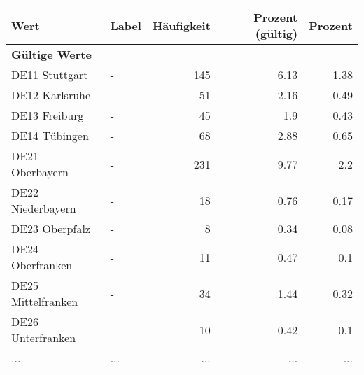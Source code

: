      \begin{longtable}{Xlrrr}
     \toprule
     \textbf{Wert} & \textbf{Label} & \textbf{Häufigkeit} & \textbf{Prozent (gültig)} & \textbf{Prozent} \\
     \endhead
     \midrule
     \multicolumn{5}{l}{\textbf{Gültige Werte}}\\
        \multicolumn{1}{X}{DE11 Stuttgart} & - & \num{145} & \num[round-mode=places,round-precision=2]{6.13} & \num[round-mode=places,round-precision=2]{1.38} \\
        \multicolumn{1}{X}{DE12 Karlsruhe} & - & \num{51} & \num[round-mode=places,round-precision=2]{2.16} & \num[round-mode=places,round-precision=2]{0.49} \\
        \multicolumn{1}{X}{DE13 Freiburg} & - & \num{45} & \num[round-mode=places,round-precision=2]{1.9} & \num[round-mode=places,round-precision=2]{0.43} \\
        \multicolumn{1}{X}{DE14 Tübingen} & - & \num{68} & \num[round-mode=places,round-precision=2]{2.88} & \num[round-mode=places,round-precision=2]{0.65} \\
        \multicolumn{1}{X}{DE21 Oberbayern} & - & \num{231} & \num[round-mode=places,round-precision=2]{9.77} & \num[round-mode=places,round-precision=2]{2.2} \\
        \multicolumn{1}{X}{DE22 Niederbayern} & - & \num{18} & \num[round-mode=places,round-precision=2]{0.76} & \num[round-mode=places,round-precision=2]{0.17} \\
        \multicolumn{1}{X}{DE23 Oberpfalz} & - & \num{8} & \num[round-mode=places,round-precision=2]{0.34} & \num[round-mode=places,round-precision=2]{0.08} \\
        \multicolumn{1}{X}{DE24 Oberfranken} & - & \num{11} & \num[round-mode=places,round-precision=2]{0.47} & \num[round-mode=places,round-precision=2]{0.1} \\
        \multicolumn{1}{X}{DE25 Mittelfranken} & - & \num{34} & \num[round-mode=places,round-precision=2]{1.44} & \num[round-mode=places,round-precision=2]{0.32} \\
        \multicolumn{1}{X}{DE26 Unterfranken} & - & \num{10} & \num[round-mode=places,round-precision=2]{0.42} & \num[round-mode=places,round-precision=2]{0.1} \\
       ... & ... & ... & ... & ... \\

\end{longtable}
